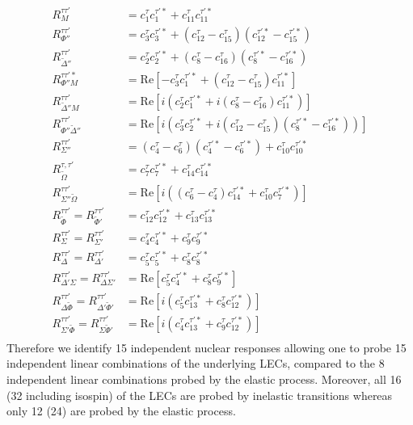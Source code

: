 \documentclass{book}[letterpaper,12pt]
\begin{document}
\begin{equation}
\begin{split}
R_M^{\tau\tau'}&=c_1^{\tau}c_1^{\tau'*}+c_{11}^{\tau}c_{11}^{\tau'*}\\
R_{\Phi''}^{\tau\tau'}&=c_3^{\tau}c_3^{\tau'*}+(c_{12}^{\tau}-c_{15}^{\tau})(c_{12}^{\tau'*}-c_{15}^{\tau'*})\\
R_{\tilde{\Delta}''}^{\tau\tau'}&=c_2^{\tau}c_2^{\tau'*}+(c_8^{\tau}-c_{16}^{\tau})(c_8^{\tau'*}-c_{16}^{\tau'*})\\
R_{\Phi''M}^{\tau\tau'*}&=\mathrm{Re}\left[-c_3^{\tau}c_1^{\tau'*}+(c_{12}^{\tau}-c_{15}^{\tau})c_{11}^{\tau'*}\right]\\
R_{\tilde{\Delta}''M}^{\tau\tau'}&=\mathrm{Re}\left[i\left(c_2^{\tau}c_1^{\tau'*}+i(c_8^{\tau}-c_{16}^{\tau})c_{11}^{\tau'*}\right)\right]\\
R_{\Phi''\tilde{\Delta}''}^{\tau\tau'}&=\mathrm{Re}\left[i\left(c_3^{\tau}c_2^{\tau'*}+i(c_{12}^{\tau}-c_{15}^{\tau})(c_8^{\tau'*}-c_{16}^{\tau'*})\right)\right]\\
R_{\Sigma''}^{\tau\tau'}&=(c_4^{\tau}-c_6^{\tau})(c_4^{\tau'*}-c_6^{\tau'*})+c_{10}^{\tau}c_{10}^{\tau'*}\\
R_{\tilde{\Omega}}^{\tau,\tau'}&=c_7^{\tau}c_7^{\tau'*}+c_{14}^{\tau}c_{14}^{\tau'*}\\
R_{\Sigma''\tilde{\Omega}}^{\tau\tau'}&=\mathrm{Re}\left[i\left((c_6^{\tau}-c_4^{\tau})c_{14}^{\tau'*}+c_{10}^{\tau}c_7^{\tau'*}\right)\right]\\
R_{\tilde{\Phi}}^{\tau\tau'}=R_{\tilde{\Phi}'}^{\tau\tau'}&=c_{12}^{\tau}c_{12}^{\tau'*}+c_{13}^{\tau}c_{13}^{\tau'*}\\
R_{\Sigma}^{\tau\tau'}=R_{\Sigma'}^{\tau\tau'}&=c_4^{\tau}c_4^{\tau'*}+c_9^{\tau}c_9^{\tau'*}\\
R_{\Delta}^{\tau\tau'}=R_{\Delta'}^{\tau\tau'}&=c_5^{\tau}c_5^{\tau'*}+c_8^{\tau}c_8^{\tau'*}\\
R_{\Delta'\Sigma}^{\tau\tau'}=R_{\Delta\Sigma'}^{\tau\tau'}&=\mathrm{Re}\left[c_5^{\tau}c_4^{\tau'*}+c_8^{\tau}c_9^{\tau'*}\right]\\
R_{\Delta\tilde{\Phi}}^{\tau\tau'}=R_{\Delta'\tilde{\Phi}'}^{\tau\tau'}&=\mathrm{Re}\left[i\left(c_5^{\tau}c_{13}^{\tau'*}+c_8^{\tau}c_{12}^{\tau'*}\right)\right]\\
R_{\Sigma'\tilde{\Phi}}^{\tau\tau'}=R_{\Sigma\tilde{\Phi}'}^{\tau\tau'}&=\mathrm{Re}\left[i\left(c_4^{\tau}c_{13}^{\tau'*}+c_9^{\tau}c_{12}^{\tau'*}\right)\right]\\
\end{split}
\end{equation}
Therefore we identify 15 independent nuclear responses allowing one to probe 15 independent linear combinations of the underlying LECs, compared to the 8 independent linear combinations probed by the elastic process. Moreover, all 16 (32 including isospin) of the LECs are probed by inelastic transitions whereas only 12 (24) are probed by the elastic process.
\end{document}
